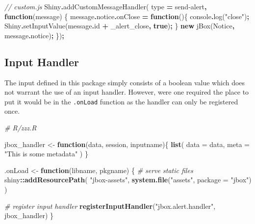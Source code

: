 \documentclass[
]{krantz}
\makeatletter
\newenvironment{Shaded}{\begin{snugshade}}{\end{snugshade}}
\newcommand{\AttributeTok}[1]{\textcolor[rgb]{0.61,0.61,0.61}{#1}}
\newcommand{\BuiltInTok}[1]{#1}
\newcommand{\CommentTok}[1]{\textcolor[rgb]{0.37,0.37,0.37}{\textit{#1}}}
\newcommand{\ControlFlowTok}[1]{\textcolor[rgb]{0.27,0.27,0.27}{\textbf{#1}}}
\newcommand{\DataTypeTok}[1]{\textcolor[rgb]{0.27,0.27,0.27}{#1}}
\newcommand{\FunctionTok}[1]{\textcolor[rgb]{0,0,0}{#1}}
\newcommand{\KeywordTok}[1]{\textcolor[rgb]{0.27,0.27,0.27}{\textbf{#1}}}
\newcommand{\NormalTok}[1]{#1}
\newcommand{\OperatorTok}[1]{\textcolor[rgb]{0.43,0.43,0.43}{\textbf{#1}}}
\newcommand{\StringTok}[1]{\textcolor[rgb]{0.5,0.5,0.5}{#1}}
\newenvironment{kframe}{%
\medskip{}
\setlength{\fboxsep}{.8em}
 \def\at@end@of@kframe{}%
 \ifinner\ifhmode%
  \def\at@end@of@kframe{\end{minipage}}%
  \begin{minipage}{\columnwidth}%
 \fi\fi%
 \def\FrameCommand##1{\hskip\@totalleftmargin \hskip-\fboxsep
 \colorbox{shadecolor}{##1}\hskip-\fboxsep
     \hskip-\linewidth \hskip-\@totalleftmargin \hskip\columnwidth}%
 \MakeFramed {\advance\hsize-\width
   \@totalleftmargin\z@ \linewidth\hsize
   \@setminipage}}%
 {\par\unskip\endMakeFramed%
 \at@end@of@kframe}
\renewenvironment{Shaded}{\begin{kframe}}{\end{kframe}}
\makeatother
\begin{document}
\begin{Shaded}
\begin{Highlighting}[]
\CommentTok{// custom.js}
\NormalTok{Shiny}\OperatorTok{.}\FunctionTok{addCustomMessageHandler}\NormalTok{(}
\NormalTok{  type }\OperatorTok{=} \StringTok{\textquotesingle{}send{-}alert\textquotesingle{}}\OperatorTok{,} \KeywordTok{function}\NormalTok{(message) \{}
\NormalTok{    message}\OperatorTok{.}\AttributeTok{notice}\OperatorTok{.}\AttributeTok{onClose} \OperatorTok{=} \KeywordTok{function}\NormalTok{()\{}
      \BuiltInTok{console}\OperatorTok{.}\FunctionTok{log}\NormalTok{(}\StringTok{"close"}\NormalTok{)}\OperatorTok{;}
\NormalTok{      Shiny}\OperatorTok{.}\FunctionTok{setInputValue}\NormalTok{(message}\OperatorTok{.}\AttributeTok{id} \OperatorTok{+} \StringTok{\textquotesingle{}\_alert\_close\textquotesingle{}}\OperatorTok{,} \KeywordTok{true}\NormalTok{)}\OperatorTok{;}
\NormalTok{    \}}
    \KeywordTok{new}\NormalTok{ jBox(}\StringTok{\textquotesingle{}Notice\textquotesingle{}}\OperatorTok{,}\NormalTok{ message}\OperatorTok{.}\AttributeTok{notice}\NormalTok{)}\OperatorTok{;}
\NormalTok{\})}\OperatorTok{;}
\end{Highlighting}
\end{Shaded}

\hypertarget{shiny-complete-pkg-input}{%
\subsection{Input Handler}\label{shiny-complete-pkg-input}}

The input defined in this package simply consists of a boolean value which does not warrant the use of an input handler. However, were one required the place to put it would be in the \texttt{.onLoad} function as the handler can only be registered once.

\begin{Shaded}
\begin{Highlighting}[]
\CommentTok{\# R/zzz.R}

\NormalTok{jbox\_handler \textless{}{-}}\StringTok{ }\ControlFlowTok{function}\NormalTok{(data, session, inputname)\{}
  \KeywordTok{list}\NormalTok{(}
    \DataTypeTok{data =}\NormalTok{ data,}
    \DataTypeTok{meta =} \StringTok{"This is some metadata"}
\NormalTok{  )}
\NormalTok{\}}

\NormalTok{.onLoad \textless{}{-}}\StringTok{ }\ControlFlowTok{function}\NormalTok{(libname, pkgname) \{}
  \CommentTok{\# serve static files}
\NormalTok{  shiny}\OperatorTok{::}\KeywordTok{addResourcePath}\NormalTok{(}
    \StringTok{"jbox{-}assets"}\NormalTok{,}
    \KeywordTok{system.file}\NormalTok{(}\StringTok{"assets"}\NormalTok{, }\DataTypeTok{package =} \StringTok{"jbox"}\NormalTok{)}
\NormalTok{  )}

  \CommentTok{\# register input handler}
  \KeywordTok{registerInputHandler}\NormalTok{(}\StringTok{"jbox.alert.handler"}\NormalTok{, jbox\_handler)}
\NormalTok{\}}
\end{Highlighting}
\end{Shaded}
\end{document}
